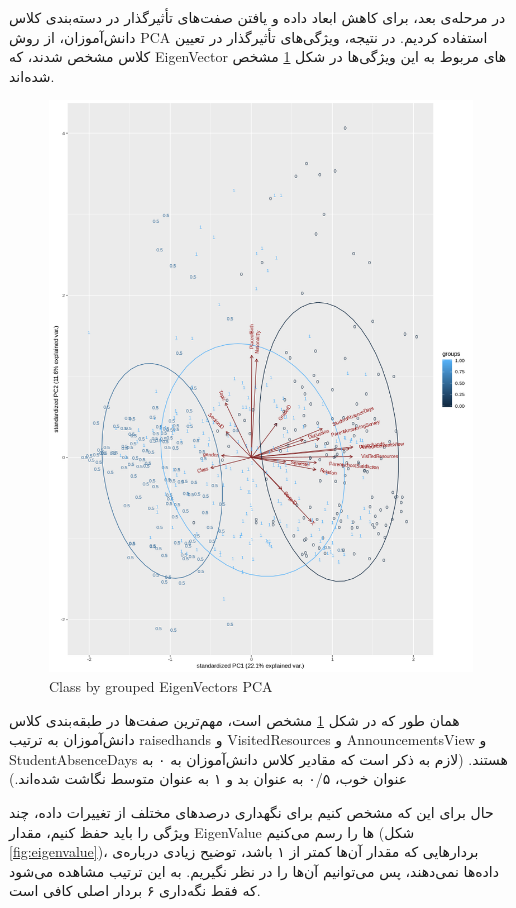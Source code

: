 \documentclass{article}
\begin{document}
\begin{large}
        در مرحله‌ی بعد، برای کاهش ابعاد داده و یافتن صفت‌های تأثیر‌گذار در دسته‌بندی کلاس دانش‌آموزان، از روش PCA استفاده کردیم. در نتیجه، ویژگی‌های تأثیرگذار در تعیین کلاس مشخص شدند، که EigenVector های مربوط به این ویژگی‌ها در شکل \ref{fig:pca} مشخص شده‌اند.

        \begin{figure}[h]
            \centering
            \includegraphics[width=.8\textwidth]{images/eigenvectors.png}
            \caption{Class by grouped EigenVectors PCA}
            \label{fig:pca}
        \end{figure}

        همان‌ طور که در شکل \ref{fig:pca} مشخص است، مهم‌ترین صفت‌ها در طبقه‌بندی کلاس دانش‌آموزان به ترتیب raisedhands و VisitedResources و AnnouncementsView و StudentAbsenceDays هستند.
        (لازم به ذکر است که مقادیر کلاس دانش‌آموزان به ۰ به عنوان خوب، ۰/۵ به عنوان بد و ۱ به عنوان متوسط نگاشت شده‌اند.)

        حال برای این که مشخص کنیم برای نگهداری درصدهای مختلف از تغییرات داده، چند ویژگی را باید حفظ کنیم، مقدار EigenValue ها را رسم می‌کنیم (شکل \ref{fig:eigenvalue})، بردارهایی که مقدار آن‌ها کمتر از ۱ باشد، توضیح زیادی درباره‌ی داده‌ها نمی‌دهند، پس می‌توانیم آن‌ها را در نظر نگیریم.
        به این ترتیب مشاهده می‌شود که فقط نگه‌داری ۶ بردار اصلی کافی‌ است.


\end{large}
\end{document}
